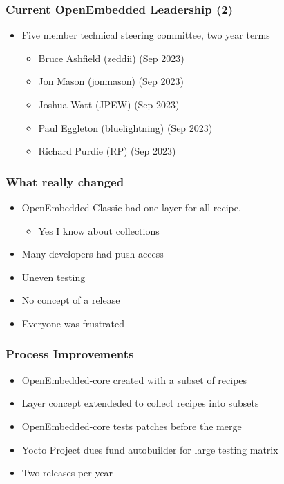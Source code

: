 \documentclass{beamer}
\begin{document}
\begin{frame}
	\frametitle{Current OpenEmbedded Leadership (2)}

	\begin{itemize}
		\item Five member technical steering committee, two year terms
			\begin{itemize}
				\item Bruce Ashfield (zeddii) (Sep 2023)
				\item Jon Mason (jonmason) (Sep 2023)
				\item Joshua Watt (JPEW) (Sep 2023)
				\item Paul Eggleton (bluelightning) (Sep 2023)
				\item Richard Purdie (RP) (Sep 2023)
			\end{itemize}
	\end{itemize}
\end{frame}


\begin{frame}
\frametitle{What really changed}

\begin{itemize}
	\item OpenEmbedded Classic had one layer for all recipe.
		\begin{itemize}
			\item Yes I know about collections
		\end{itemize}
	\item Many developers had push access
	\item Uneven testing
	\item No concept of a release
	\item Everyone was frustrated
\end{itemize}

\end{frame}

\begin{frame}
\frametitle{Process Improvements}

\begin{itemize}
	\item OpenEmbedded-core created with a subset of recipes
	\item Layer concept extendeded to collect recipes into subsets
	\item OpenEmbedded-core tests patches before the merge
	\item Yocto Project dues fund autobuilder for large testing matrix
	\item Two releases per year
\end{itemize}

\end{frame}
\end{document}
